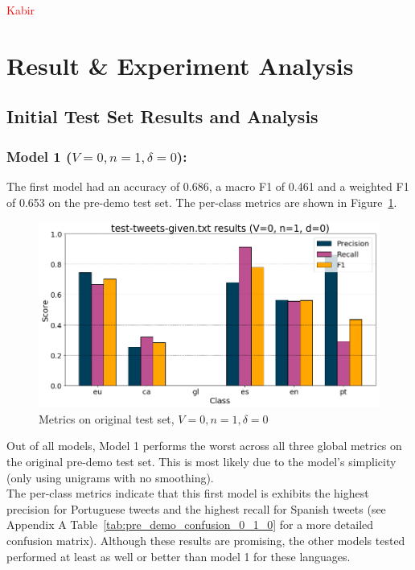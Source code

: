 \documentclass[runningheads]{llncs}
\begin{document}
\textcolor{red}{Kabir}

\newpage
\section{Result \& Experiment Analysis}

\subsection{Initial Test Set Results and Analysis}

\subsubsection{Model 1 ($V=0, n=1, \delta=0$): }
The first model had an accuracy of 0.686, a macro F1 of 0.461 and a weighted F1 of 0.653 on the pre-demo test set. The per-class metrics are shown in Figure~\ref{fig:pre_demo_0_1_0}. \\

\begin{figure}
    \begin{center}
        \includegraphics[width=12.5cm]{images/test_tweets_given_results_0_1_0.png}
        \caption{Metrics on original test set, $V=0, n=1, \delta=0$}
        \label{fig:pre_demo_0_1_0}
    \end{center}
\end{figure}

Out of all models, Model 1 performs the worst across all three global metrics on the original pre-demo test set. This is most likely due to the model's simplicity (only using unigrams with no smoothing). \\

The per-class metrics indicate that this first model is exhibits the highest precision for Portuguese tweets and the highest recall for Spanish tweets (see Appendix A Table~\ref{tab:pre_demo_confusion_0_1_0} for a more detailed confusion matrix). Although these results are promising, the other models tested performed at least as well or better than model 1 for these languages. \\
\end{document}
